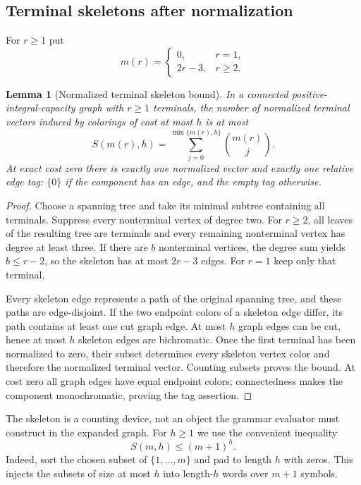 \documentclass[11pt,letterpaper]{article}
\newtheorem{lemma}[theorem]{Lemma}
\theoremstyle{definition}
\theoremstyle{remark}\newtheorem{remark}[theorem]{Remark}
\newcommand{\binoms}[2]{\sum_{j=0}^{\min\{#1,#2\}}\binom{#1}{j}}
\begin{document}
\subsection{Terminal skeletons after normalization}
For $r\ge1$ put
\[
 m(r)=\begin{cases}0,&r=1,\\2r-3,&r\ge2.\end{cases}
\]
\begin{lemma}[Normalized terminal skeleton bound]\label{lem:skeleton}
In a connected positive-integral-capacity graph with $r\ge1$ terminals, the number of normalized terminal vectors induced by colorings of cost at most $h$ is at most
\[
 S(m(r),h)=\binoms{m(r)}{h}.
\]
At exact cost zero there is exactly one normalized vector and exactly one relative edge tag: $\{0\}$ if the component has an edge, and the empty tag otherwise.
\end{lemma}
\begin{proof}
Choose a spanning tree and take its minimal subtree containing all terminals. Suppress every nonterminal vertex of degree two. For $r\ge2$, all leaves of the resulting tree are terminals and every remaining nonterminal vertex has degree at least three. If there are $b$ nonterminal vertices, the degree sum yields $b\le r-2$, so the skeleton has at most $2r-3$ edges. For $r=1$ keep only that terminal.

Every skeleton edge represents a path of the original spanning tree, and these paths are edge-disjoint. If the two endpoint colors of a skeleton edge differ, its path contains at least one cut graph edge. At most $h$ graph edges can be cut, hence at most $h$ skeleton edges are bichromatic. Once the first terminal has been normalized to zero, their subset determines every skeleton vertex color and therefore the normalized terminal vector. Counting subsets proves the bound. At cost zero all graph edges have equal endpoint colors; connectedness makes the component monochromatic, proving the tag assertion.
\end{proof}
The skeleton is a counting device, not an object the grammar evaluator must construct in the expanded graph. For $h\ge1$ we use the convenient inequality
\begin{equation}\label{eq:subset-power}
 S(m,h)\le(m+1)^h.
\end{equation}
Indeed, sort the chosen subset of $\{1,\ldots,m\}$ and pad to length $h$ with zeros. This injects the subsets of size at most $h$ into length-$h$ words over $m+1$ symbols.
\end{document}

